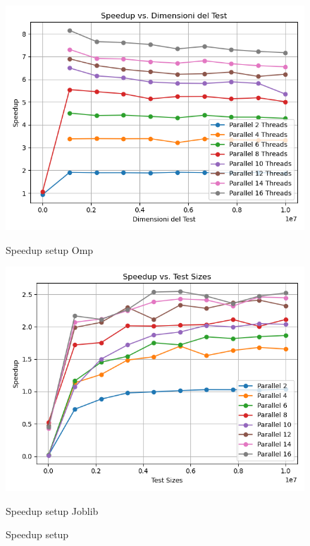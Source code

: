 \documentclass[11pt]{article}
\begin{document}
    \begin{figure}[H]
        \centering
        \includegraphics[width=\linewidth]{omp/010/filter_speedup_plot}
            \caption{Speedup setup Omp}\label{fig:010-filter_speedup_omp}
        \endminipage\hfill
        \includegraphics[width=\linewidth]{joblib/010/filter_speedup_plot}
            \caption{Speedup setup Joblib}\label{fig:010-filter_speedup_joblib}
        \endminipage\hfill
        \caption{Speedup setup}
    \end{figure}
\end{document}
